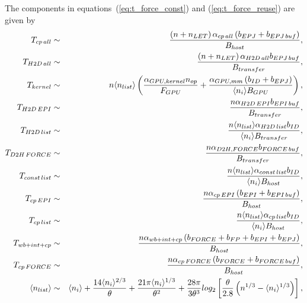 \documentclass[dvipdfmx]{pasj01}
\begin{document}
The components in equations~(\ref{eq:t_force_const}) and (\ref{eq:t_force_reuse}) are given by
\begin{eqnarray}
  T_{\rm cp\, all}  & \sim &  \frac{\left( n + n_{\rm LET} \right) \alpha_{\rm cp\, all} \left( b_{\rm EPJ}+b_{\rm EPJ\, buf} \right)}{B_{\rm host}} , \label{eq:time_cp_all} \\ 
  T_{\rm H2D\, all}  & \sim &  \frac{\left (n + n_{\rm LET} \right) \alpha_{\rm H2D\, all} b_{\rm EPJ\, buf} }{B_{\rm transfer}} , \\
  T_{\rm kernel} & \sim & n \langle n_{\rm list} \rangle \left( \frac{\alpha_{\rm GPU, kernel} n_{\rm op}}{F_{\rm GPU}}
  + \frac{\alpha_{\rm GPU, mm} \left( b_{\rm ID} + b_{\rm EPJ} \right) }{\langle n_i \rangle B_{\rm GPU}} \right),  \label{eq:kernel} \\  
  T_{\rm H2D\, EPI}  & \sim &  \frac{n \alpha_{\rm H2D\, EPI} b_{\rm EPI\, buf}}{B_{\rm transfer}}, \\
  T_{\rm H2D\, list} & \sim &  \frac{ n \langle n_{\rm list} \rangle \alpha_{\rm H2D\, list} b_{\rm ID}}{\langle n_i \rangle B_{\rm transfer}} , \\
  T_{\rm D2H\, FORCE} & \sim & \frac{n \alpha_{\rm D2H, FORCE} b_{\rm FORCE\, buf}}{B_{\rm transfer}} ,  \\
  T_{\rm const\, list}  & \sim &
  \frac{n \langle n_{\rm list} \rangle \alpha_{\rm const\, list} b_{\rm ID} }{\langle n_{\rm i} \rangle B_{\rm host}}, \label{eq:time_list} \\
  T_{\rm cp\, EPI}   & \sim &  \frac{n \alpha_{\rm cp\, EPI} \left( b_{\rm EPI}+b_{\rm EPI\, buf} \right) }{B_{\rm host}} , \\
  T_{\rm cp\, list}  & \sim &  \frac{n \langle n_{\rm list} \rangle  \alpha_{\rm cp\, list} b_{\rm ID}}{\langle n_i \rangle B_{\rm host}}, \\ 
  T_{\rm wb+int+cp} & \sim & \frac{n \alpha_{\rm wb+int+cp} \left( b_{\rm FORCE}+b_{\rm FP}+b_{\rm EPI}+b_{\rm EPJ} \right) }{B_{\rm host}}, \label{eq:wb_int_cp} \\
  T_{\rm cp\, FORCE} & \sim  & \frac{n \alpha_{\rm cp\, FORCE} \left( b_{\rm FORCE}+b_{\rm FORCE\, buf} \right)}{B_{\rm host}} , \\
  \langle n_{\rm list} \rangle & \sim & \langle n_{\rm i} \rangle + \frac{14\langle n_{\rm i} \rangle^{2/3}}{\theta} + \frac{21\pi \langle n_{\rm i} \rangle^{1/3}}{\theta^2} + \frac{28\pi}{3\theta^3} {\rm log_2} \left[ \frac{\theta}{2.8}\left(n^{1/3} - \langle n_{\rm i} \rangle^{1/3}\right)\right], \label{eq:n_list}  
\end{eqnarray}
\end{document}
